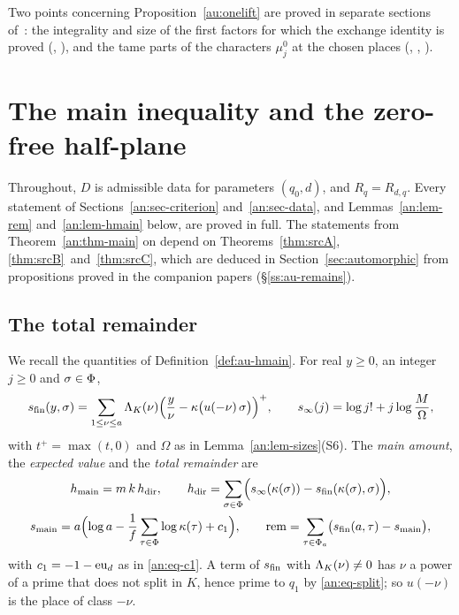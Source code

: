 \documentclass[10pt]{amsart}
\theoremstyle{definition}
\theoremstyle{remark}
\newcommand{\anThmA}{\ref{thm:srcA}}\newcommand{\anThmB}{\ref{thm:srcB}}\newcommand{\anThmC}{\ref{thm:srcC}}
\begin{document}
\noindent Two points concerning Proposition~\ref{au:onelift} are proved in separate sections of~\cite{P54}: the integrality and size of the first factors for which
the exchange identity is proved ({\cite[Theorem~6.10]{P54}}, {\cite[Proposition~6.9]{P54}}), and the tame
parts of the characters $\mu_j^0$ at the chosen places ({\cite[Definition~6.14]{P54}},
{\cite[Proposition~6.15]{P54}}, {\cite[Lemma~8.6]{P49}}).

\section{The main inequality and the zero-free half-plane}\label{an:sec-main}
Throughout, $D$ is admissible data for parameters $(q_0,d)$, and
$R_q=R_{d,q}$. Every statement of
Sections~\ref{an:sec-criterion} and~\ref{an:sec-data}, and
Lemmas~\ref{an:lem-rem} and~\ref{an:lem-hmain} below, are proved in full. The
statements from Theorem~\ref{an:thm-main} on depend on
Theorems~\anThmA, \anThmB\ and~\anThmC, which are deduced in
Section~\ref{sec:automorphic} from propositions proved in the companion papers (\S\ref{ss:au-remains}).

\subsection{The total remainder}\label{an:ssec-rem}
We recall the quantities of Definition~\ref{def:au-hmain}. For real
$y\ge0$, an integer $j\ge0$ and $\sigma\in\Phi$,
\[
 s_{\mathrm{fin}}(y,\sigma)=\sum_{1\le\nu\le a}\Lambda_K(\nu)\Bigl(\frac y\nu-\kappa\bigl(u(-\nu)\,\sigma\bigr)\Bigr)^{+},\qquad
 s_{\infty}(j)=\log j!+j\log\frac M\Omega ,
\]
with $t^{+}=\max(t,0)$ and $\Omega$ as in
Lemma~\ref{an:lem-sizes}\textup{(S6)}. The \emph{main amount}, the
\emph{expected value} and the \emph{total remainder} are
\begin{gather*}
 h_{\mathrm{main}}=m\,k\,h_{\mathrm{dir}},\qquad h_{\mathrm{dir}}=\sum_{\sigma\in\Phi}\Bigl(s_{\infty}(\kappa(\sigma))-s_{\mathrm{fin}}(\kappa(\sigma),\sigma)\Bigr),\\
 s_{\mathrm{main}}=a\Bigl(\log a-\frac1f\sum_{\tau\in\Phi}\log\kappa(\tau)+c_1\Bigr),\qquad
 \operatorname{rem}=\sum_{\tau\in\Phi_a}\bigl(s_{\mathrm{fin}}(a,\tau)-s_{\mathrm{main}}\bigr),
\end{gather*}
with $c_1=-1-\mathrm{eu}_d$ as in \eqref{an:eq-c1}. A term of $s_{\mathrm{fin}}$ with
$\Lambda_K(\nu)\ne0$ has $\nu$ a power of a prime that does not split in $K$,
hence prime to $q_1$ by \eqref{an:eq-split}; so $u(-\nu)$ is the place of
class $-\nu$.
\end{document}
